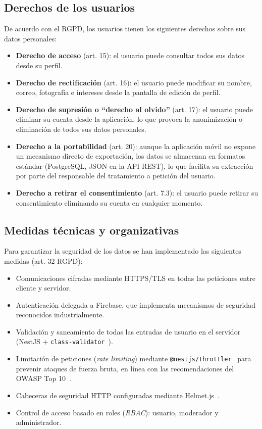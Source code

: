 \subsection{Derechos de los usuarios}

De acuerdo con el RGPD, los usuarios tienen los siguientes derechos sobre sus datos personales:

\begin{itemize}
    \item \textbf{Derecho de acceso} (art. 15): el usuario puede consultar todos sus datos desde su perfil.
    \item \textbf{Derecho de rectificación} (art. 16): el usuario puede modificar su nombre, correo, fotografía e intereses desde la pantalla de edición de perfil.
    \item \textbf{Derecho de supresión o ``derecho al olvido''} (art. 17): el usuario puede eliminar su cuenta desde la aplicación, lo que provoca la anonimización o eliminación de todos sus datos personales.
    \item \textbf{Derecho a la portabilidad} (art. 20): aunque la aplicación móvil no expone un mecanismo directo de exportación, los datos se almacenan en formatos estándar (PostgreSQL, JSON en la API REST), lo que facilita su extracción por parte del responsable del tratamiento a petición del usuario.
    \item \textbf{Derecho a retirar el consentimiento} (art. 7.3): el usuario puede retirar su consentimiento eliminando su cuenta en cualquier momento.
\end{itemize}

\subsection{Medidas técnicas y organizativas}

Para garantizar la seguridad de los datos se han implementado las siguientes medidas (art. 32 RGPD):

\begin{itemize}
    \item Comunicaciones cifradas mediante HTTPS/TLS en todas las peticiones entre cliente y servidor.
    \item Autenticación delegada a Firebase, que implementa mecanismos de seguridad reconocidos industrialmente.
    \item Validación y saneamiento de todas las entradas de usuario en el servidor (NestJS + \texttt{class-validator}~\cite{classvalidator}).
    \item Limitación de peticiones (\textit{rate limiting}) mediante \texttt{@nestjs/throttler}~\cite{nestjsthrottler} para prevenir ataques de fuerza bruta, en línea con las recomendaciones del OWASP Top 10~\cite{owasp2021}.
    \item Cabeceras de seguridad HTTP configuradas mediante Helmet.js~\cite{helmetjs}.
    \item Control de acceso basado en roles (\textit{RBAC}): usuario, moderador y administrador.
\end{itemize}

